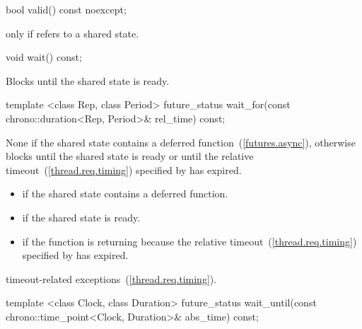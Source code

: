 %
%
\begin{itemdecl}
bool valid() const noexcept;
\end{itemdecl}

\begin{itemdescr}
\pnum
\returns {} only if  refers to a shared state.
\end{itemdescr}

%
%
\begin{itemdecl}
void wait() const;
\end{itemdecl}

\begin{itemdescr}
\pnum
\effects
Blocks until the shared state is ready.
\end{itemdescr}

%
%
\begin{itemdecl}
template <class Rep, class Period>
  future_status wait_for(const chrono::duration<Rep, Period>& rel_time) const;
\end{itemdecl}

\begin{itemdescr}
\pnum
\effects
None if the shared state contains a deferred function~(\ref{futures.async}),
otherwise
blocks until the shared state is ready or until
the relative timeout~(\ref{thread.req.timing}) specified by  has expired.

\pnum
\returns

\begin{itemize}
\item {} if the shared state contains a deferred
function.

\item {} if the shared state is ready.

\item {} if the function is returning because the
relative timeout~(\ref{thread.req.timing})
specified by  has expired.
\end{itemize}

\pnum
\throws
timeout-related exceptions~(\ref{thread.req.timing}).
\end{itemdescr}

%
%
\begin{itemdecl}
template <class Clock, class Duration>
  future_status wait_until(const chrono::time_point<Clock, Duration>& abs_time) const;
\end{itemdecl}

